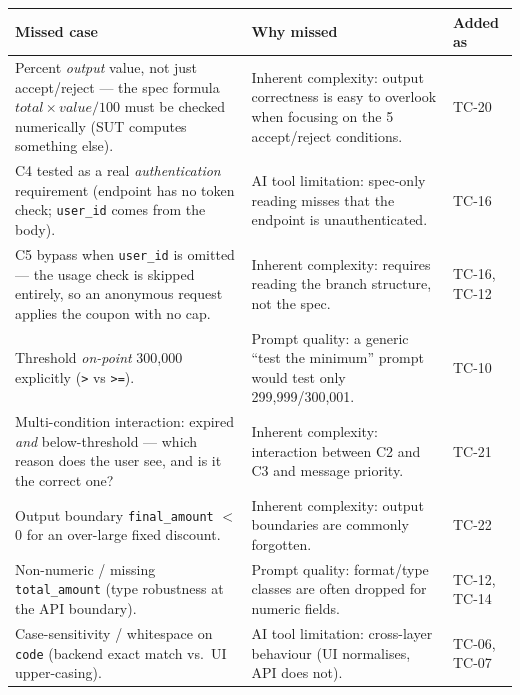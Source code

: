\documentclass[11pt,a4paper]{article}
\newcommand{\code}[1]{\texttt{#1}}
\begin{document}
\begin{center}
\begin{longtable}{@{}L{6.3cm} L{4.6cm} C{2.4cm}@{}}
\toprule
\textbf{Missed case} & \textbf{Why missed} & \textbf{Added as} \\
\midrule
\endhead
Percent \emph{output} value, not just accept/reject --- the spec formula
$total\times value/100$ must be checked numerically (SUT computes something else). &
Inherent complexity: output correctness is easy to overlook when focusing on the
5 accept/reject conditions. & TC-20 \\
C4 tested as a real \emph{authentication} requirement (endpoint has no token check;
\code{user\_id} comes from the body). & AI tool limitation: spec-only reading
misses that the endpoint is unauthenticated. & TC-16 \\
C5 bypass when \code{user\_id} is omitted --- the usage check is skipped entirely,
so an anonymous request applies the coupon with no cap. & Inherent complexity:
requires reading the branch structure, not the spec. & TC-16, TC-12 \\
Threshold \emph{on-point} 300{,}000 explicitly (\code{>} vs \code{>=}). & Prompt
quality: a generic ``test the minimum'' prompt would test only 299{,}999/300{,}001. & TC-10 \\
Multi-condition interaction: expired \emph{and} below-threshold --- which reason
does the user see, and is it the correct one? & Inherent complexity: interaction
between C2 and C3 and message priority. & TC-21 \\
Output boundary \code{final\_amount} $<$ 0 for an over-large fixed discount. &
Inherent complexity: output boundaries are commonly forgotten. & TC-22 \\
Non-numeric / missing \code{total\_amount} (type robustness at the API boundary). &
Prompt quality: format/type classes are often dropped for numeric fields. & TC-12, TC-14 \\
Case-sensitivity / whitespace on \code{code} (backend exact match vs.\ UI upper-casing). &
AI tool limitation: cross-layer behaviour (UI normalises, API does not). & TC-06, TC-07 \\
\bottomrule
\end{longtable}
\end{center}
\end{document}
